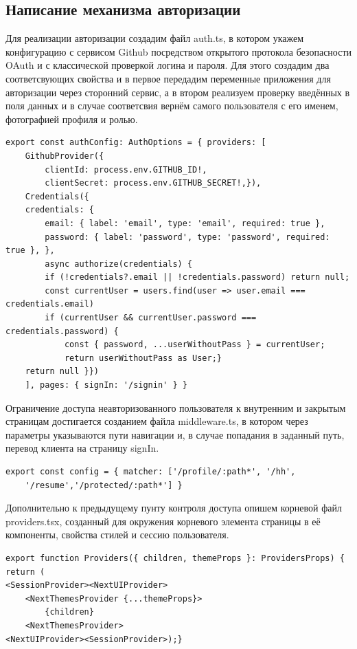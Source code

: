 \documentclass[master, och, diploma]{SCWorks}
\begin{document}
\subsection{Написание механизма авторизации}
Для реализации авторизации создадим файл auth.ts, в котором укажем конфигурацию с сервисом Github посредством открытого протокола безопасности OAuth и с классической проверкой логина и пароля. Для этого создадим два соответсвующих свойства и в первое передадим переменные приложения для авторизации через сторонний сервис, а в втором реализуем проверку введённых в поля данных и в случае соответсвия вернём самого пользователя с его именем, фотографией профиля и ролью\cite{Fain_2022}.
\begin{verbatim}
export const authConfig: AuthOptions = { providers: [
    GithubProvider({
        clientId: process.env.GITHUB_ID!,
        clientSecret: process.env.GITHUB_SECRET!,}),
    Credentials({
    credentials: {
        email: { label: 'email', type: 'email', required: true },
        password: { label: 'password', type: 'password', required: true }, },
        async authorize(credentials) {
        if (!credentials?.email || !credentials.password) return null;
        const currentUser = users.find(user => user.email === credentials.email)
        if (currentUser && currentUser.password === credentials.password) {
            const { password, ...userWithoutPass } = currentUser;
            return userWithoutPass as User;}
    return null }})
    ], pages: { signIn: '/signin' } }
\end{verbatim}

Ограничение доступа неавторизованного пользователя к внутренним и закрытым страницам достигается созданием файла middleware.ts, в котором через параметры указываются пути навигации и, в случае попадания в заданный путь, перевод клиента на страницу signIn.
\begin{verbatim}
export const config = { matcher: ['/profile/:path*', '/hh', 
    '/resume','/protected/:path*'] }
\end{verbatim}

Дополнительно к предыдущему пунту контроля доступа опишем корневой файл providers.tsx, созданный для окружения корневого элемента страницы в её компоненты, свойства стилей и сессию пользователя.
\begin{verbatim}
export function Providers({ children, themeProps }: ProvidersProps) {
return (
<SessionProvider><NextUIProvider>
    <NextThemesProvider {...themeProps}>
        {children}
    <NextThemesProvider>
<NextUIProvider><SessionProvider>);}    
\end{verbatim}
\end{document}
